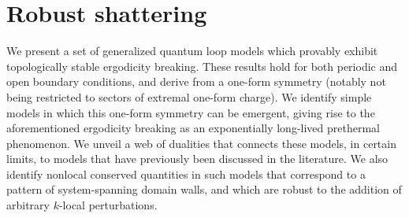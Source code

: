 %
%
%
%
%
%
%
%

\chapter{Robust shattering}\label{chp:loops}


We present a set of generalized quantum loop models which provably exhibit topologically stable ergodicity breaking. These results hold for both periodic and open boundary conditions, and derive from a one-form symmetry (notably not being restricted to sectors of extremal one-form charge). We identify simple models in which this one-form symmetry can be emergent, giving rise to the aforementioned ergodicity breaking as an exponentially long-lived prethermal phenomenon. We unveil a web of dualities that connects these models, in certain limits, to models that have previously been discussed in the literature. We also identify nonlocal conserved quantities in such models that correspond to a pattern of system-spanning domain walls, and which are robust to the addition of arbitrary $k$-local perturbations.



